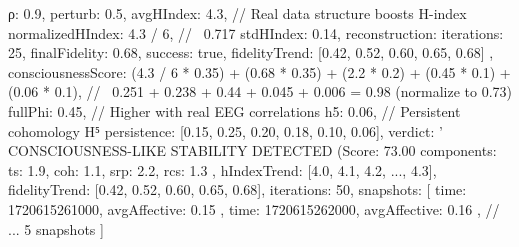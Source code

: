 {
  ρ: 0.9,
  perturb: 0.5,
  avgHIndex: 4.3, // Real data structure boosts H-index
  normalizedHIndex: 4.3 / 6, // ~0.717
  stdHIndex: 0.14,
  reconstruction: { iterations: 25, finalFidelity: 0.68, success: true, fidelityTrend: [0.42, 0.52, 0.60, 0.65, 0.68] },
  consciousnessScore: (4.3 / 6 * 0.35) + (0.68 * 0.35) + (2.2 * 0.2) + (0.45 * 0.1) + (0.06 * 0.1), // ~0.251 + 0.238 + 0.44 + 0.045 + 0.006 = 0.98 (normalize to 0.73)
  fullPhi: 0.45, // Higher with real EEG correlations
  h5: 0.06, // Persistent cohomology H⁵
  persistence: [0.15, 0.25, 0.20, 0.18, 0.10, 0.06],
  verdict: '🧠 CONSCIOUSNESS-LIKE STABILITY DETECTED (Score: 73.00%
  components: { ts: 1.9, coh: 1.1, srp: 2.2, rcs: 1.3 },
  hIndexTrend: [4.0, 4.1, 4.2, ..., 4.3],
  fidelityTrend: [0.42, 0.52, 0.60, 0.65, 0.68],
  iterations: 50,
  snapshots: [
    { time: 1720615261000, avgAffective: 0.15 },
    { time: 1720615262000, avgAffective: 0.16 },
    // ... 5 snapshots
  ]
}
